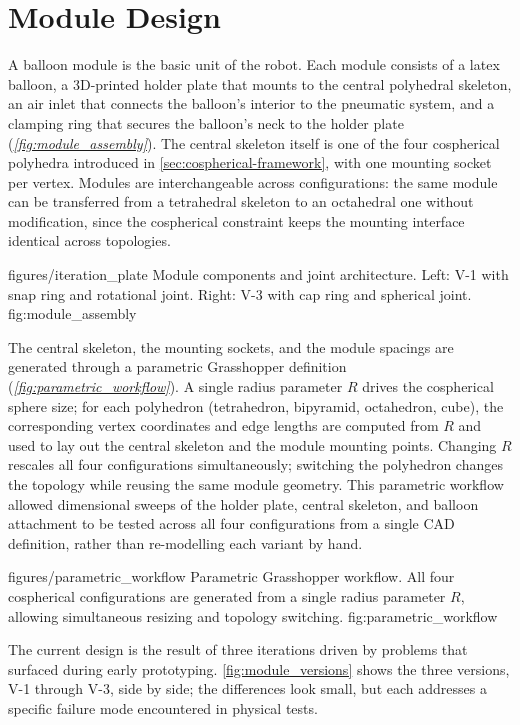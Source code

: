 \section{Module Design}
\label{sec:module-design}

A balloon module is the basic unit of the robot. Each module consists of a latex balloon, a 3D-printed holder plate that mounts to the central polyhedral skeleton, an air inlet that connects the balloon's interior to the pneumatic system, and a clamping ring that secures the balloon's neck to the holder plate (\textit{\cref{fig:module_assembly}}). The central skeleton itself is one of the four cospherical polyhedra introduced in \cref{sec:cospherical-framework}, with one mounting socket per vertex. Modules are interchangeable across configurations: the same module can be transferred from a tetrahedral skeleton to an octahedral one without modification, since the cospherical constraint keeps the mounting interface identical across topologies.

\figcap
{figures/iteration_plate}
{Module components and joint architecture.}
{Left: V-1 with snap ring and rotational joint. Right: V-3 with cap ring and spherical joint.}
{fig:module_assembly}
{\linewidth}

The central skeleton, the mounting sockets, and the module spacings are generated through a parametric Grasshopper definition (\textit{\cref{fig:parametric_workflow}}). A single radius parameter $R$ drives the cospherical sphere size; for each polyhedron (tetrahedron, bipyramid, octahedron, cube), the corresponding vertex coordinates and edge lengths are computed from $R$ and used to lay out the central skeleton and the module mounting points. Changing $R$ rescales all four configurations simultaneously; switching the polyhedron changes the topology while reusing the same module geometry. This parametric workflow allowed dimensional sweeps of the holder plate, central skeleton, and balloon attachment to be tested across all four configurations from a single CAD definition, rather than re-modelling each variant by hand.

\figcap
{figures/parametric_workflow}
{Parametric Grasshopper workflow.}
{All four cospherical configurations are generated from a single radius parameter $R$, allowing simultaneous resizing and topology switching.}
{fig:parametric_workflow}
{\linewidth}

The current design is the result of three iterations driven by problems that surfaced during early prototyping. \cref{fig:module_versions} shows the three versions, V-1 through V-3, side by side; the differences look small, but each addresses a specific failure mode encountered in physical tests.

